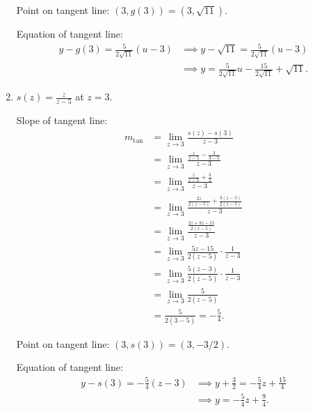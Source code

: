 \documentclass[nooutcomes]{ximera}
\begin{document}
\begin{problem}
\begin{enumerate}
\begin{freeResponse}
        Point on tangent line: $(3, g(3)) = (3, \sqrt{11})$.

        Equation of tangent line:
        \begin{align*}
          y - g(3) = \frac{5}{2\sqrt{11}}(u-3)
          &\implies y - \sqrt{11} = \frac{5}{2\sqrt{11}}(u - 3)\\
          &\implies y = \frac{5}{2\sqrt{11}}u - \frac{15}{2\sqrt{11}} + \sqrt{11}.
        \end{align*}
      \end{freeResponse}

    \item
      $\displaystyle s(z) = \frac{z}{z-5}$ at $z = 3$.
      \begin{freeResponse}
        Slope of tangent line:
        \begin{align*}
          m_{\mathrm{tan}}
          &= \lim_{z \to 3} \frac{s(z) - s(3)}{z-3}  \\
		&= \lim_{z \to 3} \frac{\frac{z}{z-5} - \frac{3}{3-5}}{z-3}  \\
		&= \lim_{z \to 3} \frac{\frac{z}{z-5} + \frac{3}{2}}{z-3}  \\
		&= \lim_{z \to 3} \frac{\frac{2z}{2(z-5)} + \frac{3(z-5)}{2(z-5)}}{z-3}  \\
		&= \lim_{z \to 3} \frac{\frac{2z + 3z - 15}{2(z-5)}}{z-3}  \\
		&= \lim_{z \to 3} \frac{5z-15}{2(z-5)} \cdot \frac{1}{z-3}  \\
		&= \lim_{z \to 3} \frac{5(z-3)}{2(z-5)} \cdot \frac{1}{z-3}  \\
		&= \lim_{z \to 3} \frac{5}{2(z-5)}  \\
		&= \frac{5}{2(3-5)} = -\frac{5}{4}.
	\end{align*}

        Point on tangent line: $(3, s(3)) = (3, -3/2)$.

        Equation of tangent line:
        \begin{align*}
          y - s(3) = - \frac{5}{4}(z-3) &\implies y + \frac{3}{2} = - \frac{5}{4}z + \frac{15}{4}\\
          &\implies y = - \frac{5}{4} z + \frac{9}{4}.
        \end{align*}
      \end{freeResponse}
  \end{enumerate}
\end{problem}
\end{document}
